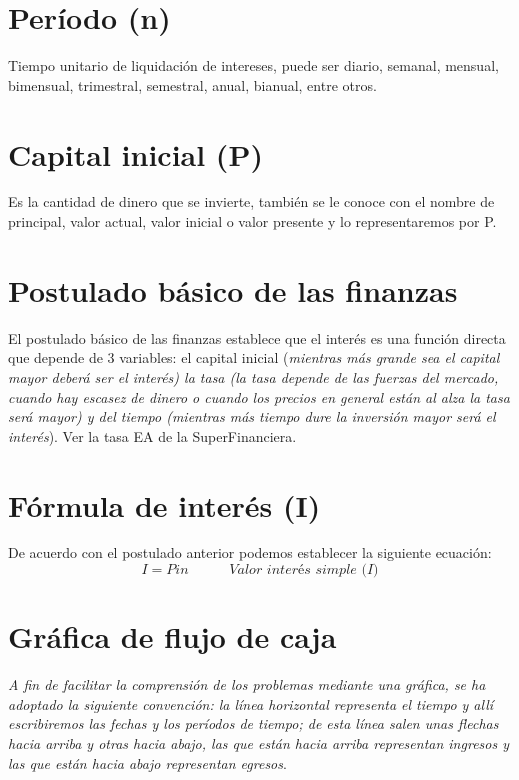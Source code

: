 \section{Período (n)}
Tiempo unitario de liquidación de intereses, puede ser diario, semanal, mensual, bimensual, trimestral, semestral, anual, bianual, entre otros. %

\section{Capital inicial (P)}
Es la cantidad de dinero que se invierte, también se le conoce con el nombre de principal, valor actual, valor inicial o valor presente y lo representaremos por P.

\section{Postulado básico de las finanzas}
El postulado básico de las finanzas establece que el interés es una función directa que depende de 3 variables: el capital inicial (\textit{mientras más grande sea el capital mayor deberá ser el interés) la tasa (la tasa depende de las fuerzas del mercado, cuando hay escasez de dinero o cuando los precios en general están al alza la tasa será mayor) y del tiempo (mientras más tiempo dure la inversión mayor será el interés}). Ver la tasa EA de la SuperFinanciera.

\section{Fórmula de interés (I)}
De acuerdo con el postulado anterior podemos establecer la siguiente ecuación:
\begin{equation}
	I = Pin \hspace{35pt} \textit{Valor interés simple (I)}
\end{equation}

\section{Gráfica de flujo de caja}
\textit{A fin de facilitar la comprensión de los problemas mediante una gráfica, se ha adoptado la siguiente convención: la línea horizontal representa el tiempo y allí escribiremos las fechas y los períodos de tiempo; de esta línea salen unas flechas hacia arriba y otras hacia abajo, las que están hacia arriba representan ingresos y las que están hacia abajo representan egresos}.

